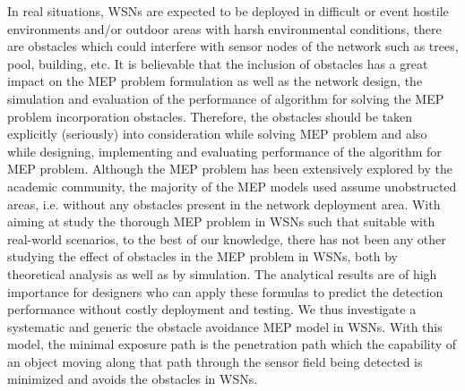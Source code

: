 \documentclass[final]{elsarticle}
\begin{document}
In real situations, WSNs are expected to be deployed in difficult or event hostile environments and/or outdoor areas with harsh environmental conditions, there are obstacles which could interfere with sensor nodes of the network such as trees, pool, building, etc. It is believable that the inclusion of obstacles has a great impact on the MEP problem formulation as well as the network design, the simulation and evaluation of the performance of algorithm for solving the MEP problem incorporation obstacles. Therefore, the obstacles should be taken explicitly (seriously) into consideration while solving MEP problem and also while designing, implementing and evaluating performance of the algorithm for MEP problem. Although the MEP problem has been extensively explored by the academic community, the majority of the MEP models used assume unobstructed areas, i.e. without any obstacles present in the network deployment area. With aiming at study the thorough MEP problem in WSNs such that suitable with real-world scenarios, to the best of our knowledge, there has not been any other studying the effect of obstacles in the MEP problem in WSNs, both by theoretical analysis as well as by simulation. The analytical results are of high importance for designers who can apply these formulas to predict the detection performance without costly deployment and testing. We thus investigate a systematic and generic the obstacle avoidance MEP model in WSNs. With this model, the minimal exposure path is the penetration path which the capability of an object moving along that path through the sensor field being detected is minimized and avoids the obstacles in WSNs. 
\end{document}
